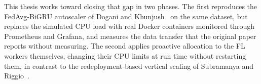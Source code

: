 This thesis works toward closing that gap in two phases. The first reproduces the FedAvg-BiGRU autoscaler of Dogani and Khunjush~\cite{dogani2024} on the same dataset, but replaces the simulated \ac{CPU} load with real Docker containers monitored through Prometheus and Grafana, and measures the data transfer that the original paper reports without measuring. The second applies proactive allocation to the \ac{FL} workers themselves, changing their \ac{CPU} limits at run time without restarting them, in contrast to the redeployment-based vertical scaling of Subramanya and Riggio~\cite{subramanya2021}.

